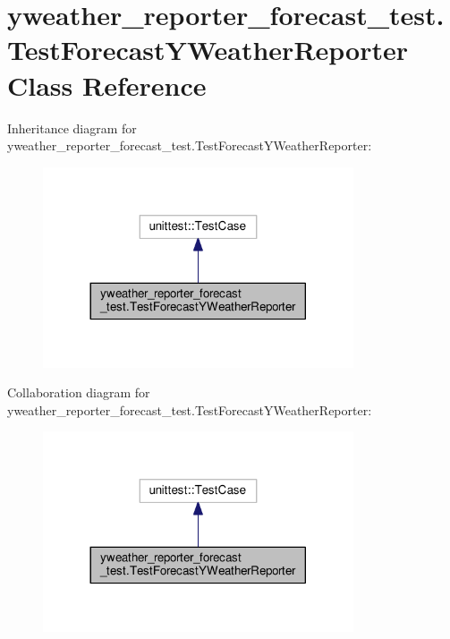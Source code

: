 \hypertarget{classyweather__reporter__forecast__test_1_1TestForecastYWeatherReporter}{\section{yweather\-\_\-reporter\-\_\-forecast\-\_\-test.\-Test\-Forecast\-Y\-Weather\-Reporter Class Reference}
\label{classyweather__reporter__forecast__test_1_1TestForecastYWeatherReporter}
}


Inheritance diagram for yweather\-\_\-reporter\-\_\-forecast\-\_\-test.\-Test\-Forecast\-Y\-Weather\-Reporter\-:
\nopagebreak
\begin{figure}[H]
\begin{center}
\leavevmode
\includegraphics[width=260pt]{classyweather__reporter__forecast__test_1_1TestForecastYWeatherReporter__inherit__graph}
\end{center}
\end{figure}


Collaboration diagram for yweather\-\_\-reporter\-\_\-forecast\-\_\-test.\-Test\-Forecast\-Y\-Weather\-Reporter\-:
\nopagebreak
\begin{figure}[H]
\begin{center}
\leavevmode
\includegraphics[width=260pt]{classyweather__reporter__forecast__test_1_1TestForecastYWeatherReporter__coll__graph}
\end{center}
\end{figure}
